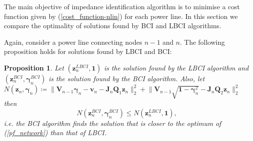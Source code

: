 \documentclass[journal,10pt,onecolumn,draftclsnofoot,]{IEEEtran}
\theoremstyle{plain}
\newtheorem{proposition}{Proposition}
\theoremstyle{definition}
\theoremstyle{remark}
\begin{document}
The main objective of impedance identification algorithm is to minimise a cost function given by (\ref{cost_function-nlin}) for each power line. In this section we compare the optimality of solutions found by BCI and LBCI algorithms.

Again, consider a power line connecting nodes $n-1$ and $n$. The following proposition holds for solutions found by LBCI and BCI: 
\begin{proposition}
\label{prop_bci_vs_lbci}
Let $(\bm{z}_n^{LBCI}, \bm{1})$ is the solution found by the LBCI algorithm and $(\bm{z}_n^{BCI}, \bm{\gamma}^{BCI}_{n})$ is the solution found by the BCI algorithm.
Also, let $N(\bm{z}_n, \bm{\gamma}_{n}) \coloneqq \big\| \bm{V}_{n-1}\bm{\gamma}_{n} - \bm{v}_{n} - \bm{J}_{n}\bm{Q}_1\bm{z}_{n} \big\|_2^2 + \big\|\bm{V}_{n-1}\sqrt{\bm{1} - \bm{\gamma}^2_{n}} - \bm{J}_{n}\bm{Q}_2\bm{z}_{n} \big\|_2^2$ then
$$N(\bm{z}_n^{BCI}, \bm{\gamma}^{BCI}_{n}) \le N(\bm{z}_n^{LBCI}, \bm{1}),$$
i.e. the BCI algorithm finds the solution that is closer to the optimum of (\ref{pf_network}) than that of LBCI.
\end{proposition}
\end{document}
